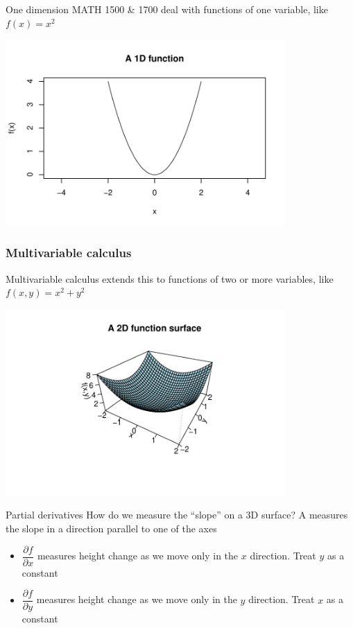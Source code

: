 \documentclass[aspectratio=169]{beamer}\usepackage[]{graphicx}\usepackage[]{xcolor}
\newenvironment{knitrout}{}{} %
\begin{document}
\begin{frame}{One dimension}
MATH 1500 \& 1700 deal with functions of one variable, like $f(x) = x^2$
\begin{center}
\begin{knitrout}
\color{fgcolor}
\includegraphics[width=0.8\textwidth]{FIGS/L04-fig1d-1} 
\end{knitrout}
\end{center}
\end{frame}

\begin{frame}[fragile]\frametitle{Multivariable calculus}
Multivariable calculus extends this to functions of two or more variables, like $f(x, y) = x^2 + y^2$
\begin{center}
\begin{knitrout}
\color{fgcolor}
\includegraphics[width=0.8\textwidth]{FIGS/L04-fig2d-1} 
\end{knitrout}
\end{center}
\end{frame}


\begin{frame}{Partial derivatives}
  How do we measure the ``slope'' on a 3D surface?
  \vfill
  A  measures the slope in a direction parallel to one of the axes
  \vfill
  \begin{itemize}
    \item $\dfrac{\partial f}{\partial x}$ measures height change as we move only in the $x$ direction. Treat $y$ as a constant
    \vfill
    \item $\dfrac{\partial f}{\partial y}$ measures height change as we move only in the $y$ direction. Treat $x$ as a constant
  \end{itemize}
\end{frame}
\end{document}
